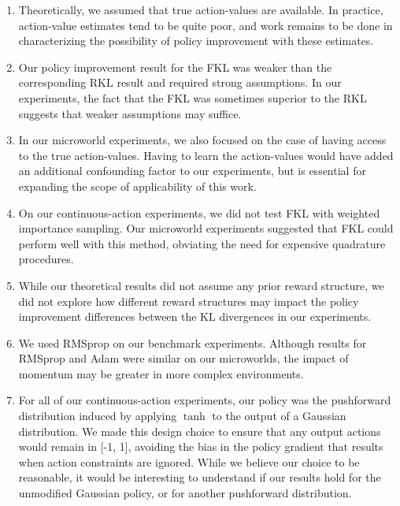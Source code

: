 \documentclass[\main/thesis.tex]{subfiles}
\begin{document}
\begin{enumerate}
    \item Theoretically, we assumed that true action-values are available. In practice, action-value estimates tend to be quite poor, and work remains to be done in characterizing the possibility of policy improvement with these estimates.
    
    \item Our policy improvement result for the FKL was weaker than the corresponding RKL result and required strong assumptions. In our experiments, the fact that the FKL was sometimes superior to the RKL suggests that weaker assumptions may suffice.
    
    \item In our microworld experiments, we also focused on the case of having access to the true action-values. Having to learn the action-values would have added an additional confounding factor to our experiments, but is essential for expanding the scope of applicability of this work. 
    
    \item On our continuous-action experiments, we did not test FKL with weighted importance sampling. Our microworld experiments suggested that FKL could perform well with this method, obviating the need for expensive quadrature procedures. 
    
    \item While our theoretical results did not assume any prior reward structure, we did not explore how different reward structures may impact the policy improvement differences between the KL divergences in our experiments. 
    
    \item We used RMSprop on our benchmark experiments. Although results for RMSprop and Adam were similar on our microworlds, the impact of momentum may be greater in more complex environments. 
    
    \item For all of our continuous-action experiments, our policy was the pushforward distribution induced by applying $\tanh$ to the output of a Gaussian distribution. We made this design choice to ensure that any output actions would remain in [-1, 1], avoiding the bias \citep{chou2017improving} in the policy gradient that results when action constraints are ignored. While we believe our choice to be reasonable, it would be interesting to understand if our results hold for the unmodified Gaussian policy, or for another pushforward distribution. 
\end{enumerate}
\end{document}
